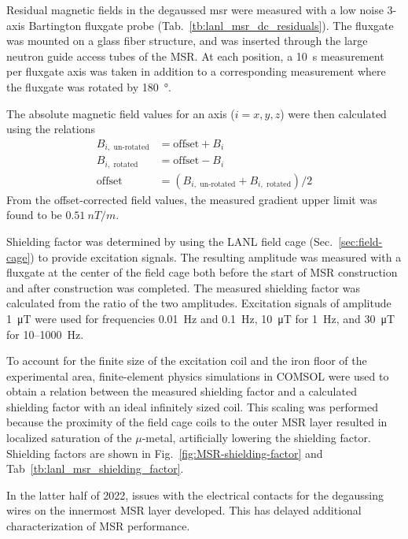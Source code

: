 Residual magnetic fields in the degaussed \acrshort*{msr} were measured with a low noise 3-axis Bartington fluxgate probe (Tab.~\ref{tb:lanl_msr_dc_residuals}). The fluxgate was mounted on a glass fiber structure, and was inserted through the large neutron guide access tubes of the MSR. At each position, a \qty{10}{\second} measurement per fluxgate axis was taken in addition to a corresponding measurement where the fluxgate was rotated by \qty{180}{\degree}.

The absolute magnetic field values for an axis ($i=x,y,z$) were then calculated using the relations
%
\begin{align}
    B_{i,\text{ un-rotated}}&=\text{offset}+B_{i}\\
    B_{i,\text{ rotated}}&=\text{offset}-B_{i}\\
    \text{offset}&= (B_{i,\text{ un-rotated}} + B_{i,\text{ rotated}})/2
\end{align}
%
From the offset-corrected field values, the measured gradient upper limit was found to be $\qty{0.51}{nT\per m}$.

Shielding factor was determined by using the LANL field cage (Sec.~\ref{sec:field-cage}) to provide excitation signals. The resulting amplitude was measured with a fluxgate at the center of the field cage both before the start of MSR construction and after construction was completed. The measured shielding factor was calculated from the ratio of the two amplitudes. Excitation signals of amplitude \qty{1}{\micro\tesla} were used for frequencies \qty{0.01}{\hertz} and \qty{0.1}{\hertz}, \qty{10}{\micro\tesla} for \qty{1}{\hertz}, and \qty{30}{\micro\tesla} for 10--\qty{1000}{\hertz}. 

To account for the finite size of the excitation coil and the iron floor of the experimental area, finite-element physics simulations in COMSOL were used to obtain a relation between the measured shielding factor and a calculated shielding factor with an ideal infinitely sized coil. This scaling was performed because the proximity of the field cage coils to the outer MSR layer resulted in localized saturation of the $\mu$-metal, artificially lowering the shielding factor. Shielding factors are shown in Fig.~\ref{fig:MSR-shielding-factor} and Tab~\ref{tb:lanl_msr_shielding_factor}. 

In the latter half of 2022, issues with the electrical contacts for the degaussing wires on the innermost MSR layer developed. This has delayed additional characterization of MSR performance.

